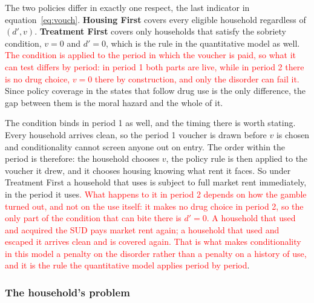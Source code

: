 \documentclass[10pt]{article}
\begin{document}
The two policies differ in exactly one respect, the last indicator in
equation~\eqref{eq:vouch}. \textbf{Housing First} covers every eligible
household regardless of $(d',v)$. \textbf{Treatment First} covers only
households that satisfy the sobriety condition, $v=0$ and $d'=0$, which is the
rule in the quantitative model as well. \textcolor{red}{The condition is applied to the
period in which the voucher is paid, so what it can test differs by period: in
period 1 both parts are live, while in period 2 there is no drug choice, $v=0$
there by construction, and only the disorder can fail it.} Since policy coverage in the states
that follow drug use is the only difference, the gap between them is the moral
hazard and the whole of it.

The condition binds in period 1 as well, and the timing there is worth stating.
Every household arrives clean, so the period 1 voucher is drawn before $v$ is
chosen and conditionality cannot screen anyone out on entry. The order
within the period is therefore: the household chooses $v$, the policy rule is
then applied to the voucher it drew, and it chooses housing knowing what rent it
faces. So under Treatment First a household that uses is subject to
full market rent immediately, in the period it uses\textcolor{red}{. What happens to it in period 2
depends on how the gamble turned out, and not on the use itself: it makes no
drug choice in period 2, so the only part of the condition that can bite there
is $d'=0$. A household that used and acquired the SUD pays market rent again; a
household that used and escaped it arrives clean and is covered again. That is
what makes conditionality in this model a penalty on the disorder rather than a
penalty on a history of use, and it is the rule the quantitative model applies
period by period}.

\subsubsection{The household's problem}\label{sec:problem}
\end{document}
